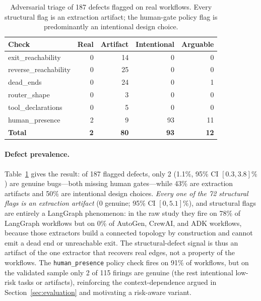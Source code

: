 \begin{table}[t]
\centering
\small
\caption{Adversarial triage of 187 defects flagged on real workflows. Every
structural flag is an extraction artifact; the human-gate policy flag is
predominantly an intentional design choice.}
\label{tab:realworld_triage}
\begin{tabular}{@{}lrrrr@{}}
\toprule
\textbf{Check} & \textbf{Real} & \textbf{Artifact} & \textbf{Intentional} & \textbf{Arguable} \\
\midrule
exit\_reachability     & 0 & 14 & 0  & 0 \\
reverse\_reachability  & 0 & 25 & 0  & 0 \\
dead\_ends             & 0 & 24 & 0  & 1 \\
router\_shape          & 0 & 3  & 0  & 0 \\
tool\_declarations     & 0 & 5  & 0  & 0 \\
human\_presence        & 2 & 9  & 93 & 11 \\
\midrule
\textbf{Total}         & \textbf{2} & \textbf{80} & \textbf{93} & \textbf{12} \\
\bottomrule
\end{tabular}
\end{table}

\paragraph{Defect prevalence.}
Table~\ref{tab:realworld_triage} gives the result: of 187 flagged defects, only
2 (1.1\%, 95\% CI $[0.3,3.8]\%$) are genuine bugs---both missing human
gates---while 43\% are extraction artifacts and 50\% are intentional design
choices. \emph{Every one of the 72 structural flags is an extraction artifact}
(0 genuine; 95\% CI $[0,5.1]\%$), and structural flags are entirely a
LangGraph phenomenon: in the raw study they fire on 78\% of LangGraph workflows
but on 0\% of AutoGen, CrewAI, and ADK workflows, because those extractors build
a connected topology by construction and cannot emit a dead end or unreachable
exit. The structural-defect signal is thus an artifact of the one extractor that
recovers real edges, not a property of the workflows. The \texttt{human\_presence}
policy check fires on 91\% of workflows, but on the validated sample only 2 of
115 firings are genuine (the rest intentional low-risk tasks or artifacts),
reinforcing the context-dependence argued in Section~\ref{sec:evaluation} and
motivating a risk-aware variant.

